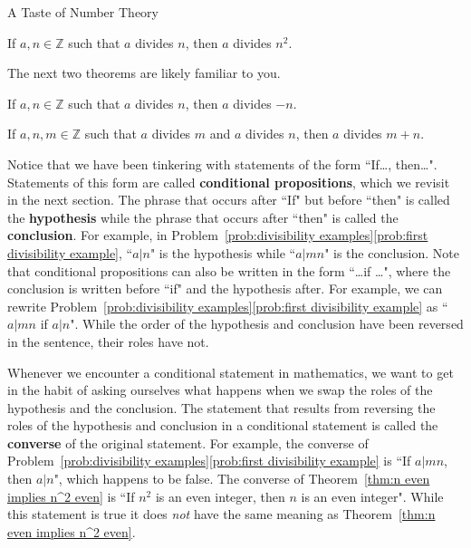 \begin{section}{A Taste of Number Theory}
\begin{corollary}\label{cor:a divs n implies a divs n^2}
If $a,n\in\mathbb{Z}$ such that $a$ divides $n$, then $a$ divides $n^2$.
\end{corollary}

The next two theorems are likely familiar to you.

\begin{theorem}\label{thm:divides negative}
If $a,n\in\mathbb{Z}$ such that $a$ divides $n$, then $a$ divides $-n$. 
\end{theorem}

\begin{theorem}\label{thm:divides sum}
If $a,n,m\in\mathbb{Z}$ such that $a$ divides $m$ and $a$ divides $n$, then $a$ divides $m+n$. 
\end{theorem}

Notice that we have been tinkering with statements of the form ``If\ldots, then\ldots". Statements of this form are called \textbf{conditional propositions}, which we revisit in the next section.  The phrase that occurs after ``If" but before ``then" is called the \textbf{hypothesis} while the phrase that occurs after ``then" is called the \textbf{conclusion}.  For example, in Problem~\ref{prob:divisibility examples}\ref{prob:first divisibility example}, ``$a|n$" is the hypothesis while ``$a|mn$" is the conclusion.  Note that conditional propositions can also be written in the form ``\ldots if \ldots", where the conclusion is written before ``if" and the hypothesis after. For example, we can rewrite Problem~\ref{prob:divisibility examples}\ref{prob:first divisibility example} as ``$a|mn$ if $a|n$".  While the order of the hypothesis and conclusion have been reversed in the sentence, their roles have not.

Whenever we encounter a conditional statement in mathematics, we want to get in the habit of asking ourselves what happens when we swap the roles of the hypothesis and the conclusion.  The statement that results from reversing the roles of the hypothesis and conclusion in a conditional statement is called the \textbf{converse} of the original statement.  For example, the converse of Problem~\ref{prob:divisibility examples}\ref{prob:first divisibility example} is ``If $a|mn$, then $a|n$", which happens to be false. The converse of Theorem~\ref{thm:n even implies n^2 even} is ``If $n^2$ is an even integer, then $n$ is an even integer". While this statement is true it does \emph{not} have the same meaning as Theorem~\ref{thm:n even implies n^2 even}. 


\end{section}
